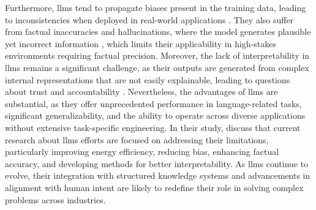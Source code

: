 Furthermore, \glspl{llm} tend to propagate biases present in the training data, leading to inconsistencies when deployed in real-world applications \cite{Naveed2023}.
They also suffer from factual inaccuracies and hallucinations, where the model generates plausible yet incorrect information \cite{Chang2024}, which limits their applicability in high-stakes environments requiring factual precision.
Moreover, the lack of interpretability in \glspl{llm} remains a significant challenge, as their outputs are generated from complex internal representations that are not easily explainable, leading to questions about trust and accountability \cite{Naveed2023}.
Nevertheless, the advantages of \glspl{llm} are substantial, as they offer unprecedented performance in language-related tasks, significant generalizability, and the ability to operate across diverse applications without extensive task-specific engineering.
In their study, \textcite{Naveed2023} discuss that current research about \glspl{llm} efforts are focused on addressing their limitations, particularly improving energy efficiency, reducing bias, enhancing factual accuracy, and developing methods for better interpretability.
As \glspl{llm} continue to evolve, their integration with structured knowledge systems and advancements in alignment with human intent are likely to redefine their role in solving complex problems across industries.